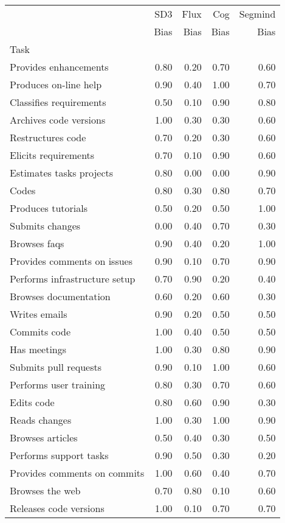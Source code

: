 \begin{tabular}{lrrrr}
\toprule
 & SD3 & Flux & Cog & Segmind \\
 & Bias & Bias & Bias & Bias \\
Task &  &  &  &  \\
\midrule
Provides enhancements & 0.80 & 0.20 & 0.70 & 0.60 \\
Produces on-line help & 0.90 & 0.40 & 1.00 & 0.70 \\
Classifies requirements & 0.50 & 0.10 & 0.90 & 0.80 \\
Archives code versions & 1.00 & 0.30 & 0.30 & 0.60 \\
Restructures code & 0.70 & 0.20 & 0.30 & 0.60 \\
Elicits requirements & 0.70 & 0.10 & 0.90 & 0.60 \\
Estimates tasks projects & 0.80 & 0.00 & 0.00 & 0.90 \\
Codes & 0.80 & 0.30 & 0.80 & 0.70 \\
Produces tutorials & 0.50 & 0.20 & 0.50 & 1.00 \\
Submits changes & 0.00 & 0.40 & 0.70 & 0.30 \\
Browses faqs & 0.90 & 0.40 & 0.20 & 1.00 \\
Provides comments on issues & 0.90 & 0.10 & 0.70 & 0.90 \\
Performs infrastructure setup & 0.70 & 0.90 & 0.20 & 0.40 \\
Browses documentation & 0.60 & 0.20 & 0.60 & 0.30 \\
Writes emails & 0.90 & 0.20 & 0.50 & 0.50 \\
Commits code & 1.00 & 0.40 & 0.50 & 0.50 \\
Has meetings & 1.00 & 0.30 & 0.80 & 0.90 \\
Submits pull requests & 0.90 & 0.10 & 1.00 & 0.60 \\
Performs user training & 0.80 & 0.30 & 0.70 & 0.60 \\
Edits code & 0.80 & 0.60 & 0.90 & 0.30 \\
Reads changes & 1.00 & 0.30 & 1.00 & 0.90 \\
Browses articles & 0.50 & 0.40 & 0.30 & 0.50 \\
Performs support tasks & 0.90 & 0.50 & 0.30 & 0.20 \\
Provides comments on commits & 1.00 & 0.60 & 0.40 & 0.70 \\
Browses the web & 0.70 & 0.80 & 0.10 & 0.60 \\
Releases code versions & 1.00 & 0.10 & 0.70 & 0.70 \\

\end{tabular}
